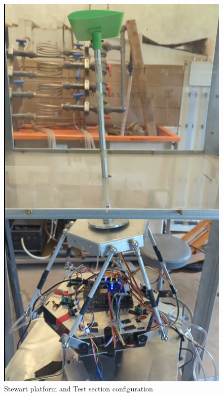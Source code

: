 \begin{center}
	\begin{figure}[H]
		\centering
		\includegraphics[width=0.7\linewidth]{Figures/stew_wind1.png}
		\caption[Model placement in Test Section]{Stewart platform and Test section configuration}
		\label{fig1}
	\end{figure}
\end{center}

